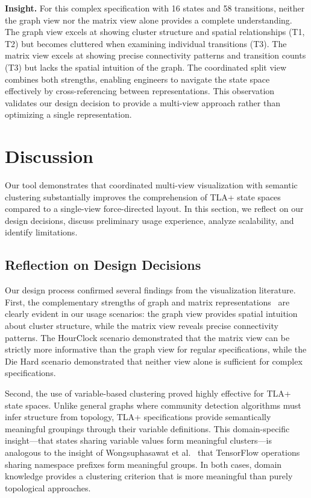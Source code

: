 \documentclass[conference]{IEEEtran}
\begin{document}
\textbf{Insight.} For this complex specification with 16 states and 58 transitions, neither the graph view nor the matrix view alone provides a complete understanding. The graph view excels at showing cluster structure and spatial relationships (T1, T2) but becomes cluttered when examining individual transitions (T3). The matrix view excels at showing precise connectivity patterns and transition counts (T3) but lacks the spatial intuition of the graph. The coordinated split view combines both strengths, enabling engineers to navigate the state space effectively by cross-referencing between representations. This observation validates our design decision to provide a multi-view approach rather than optimizing a single representation.

\section{Discussion}
\label{sec:discussion}

Our tool demonstrates that coordinated multi-view visualization with semantic clustering substantially improves the comprehension of TLA+ state spaces compared to a single-view force-directed layout. In this section, we reflect on our design decisions, discuss preliminary usage experience, analyze scalability, and identify limitations.

\subsection{Reflection on Design Decisions}

Our design process confirmed several findings from the visualization literature. First, the complementary strengths of graph and matrix representations~\cite{ghoniem2004comparison, henry2006matrixexplorer} are clearly evident in our usage scenarios: the graph view provides spatial intuition about cluster structure, while the matrix view reveals precise connectivity patterns. The HourClock scenario demonstrated that the matrix view can be strictly more informative than the graph view for regular specifications, while the Die Hard scenario demonstrated that neither view alone is sufficient for complex specifications.

Second, the use of variable-based clustering proved highly effective for TLA+ state spaces. Unlike general graphs where community detection algorithms must infer structure from topology, TLA+ specifications provide semantically meaningful groupings through their variable definitions. This domain-specific insight---that states sharing variable values form meaningful clusters---is analogous to the insight of Wongsuphasawat et al.~\cite{wongsuphasawat2018tensorflow} that TensorFlow operations sharing namespace prefixes form meaningful groups. In both cases, domain knowledge provides a clustering criterion that is more meaningful than purely topological approaches.
\end{document}

